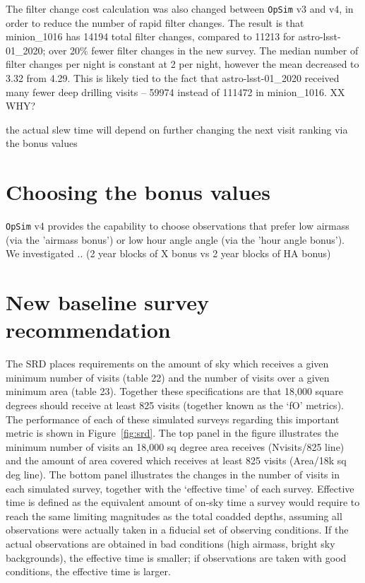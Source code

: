 \documentclass[DM,lsstdraft,authoryear,toc]{lsstdoc}
\newcommand{\opsim}{\texttt{OpSim}\xspace}
\begin{document}
The filter change cost calculation was also changed between \opsim v3 and v4, in order to reduce the number of rapid filter changes. The result is that minion\_1016 has 14194 total filter changes, compared to 11213 for astro-lsst-01\_2020; over 20\% fewer filter changes in the new survey. The median number of filter changes per night is constant at 2 per night, however the mean decreased to 3.32 from 4.29. This is likely tied to the fact that astro-lsst-01\_2020 received many fewer deep drilling visits -- 59974 instead of 111472 in minion\_1016. 
XX WHY? 


the actual slew time will depend on further changing the next visit ranking via the bonus values

\section{Choosing the bonus values} 

\opsim v4 provides the capability to choose observations that prefer low airmass (via the 'airmass bonus') or low hour angle angle (via the 'hour angle bonus'). We investigated ..
(2 year blocks of X bonus vs 2 year blocks of HA bonus)


\section{New baseline survey recommendation}

The SRD places requirements on the amount of sky which receives a given minimum number of visits (table 22) and the number of visits over a given minimum area (table 23). Together these specifications are that 18,000 square degrees should receive at least 825 visits (together known as the `fO' metrics). The performance of each of these simulated surveys regarding this important metric is shown in Figure~\ref{fig:srd}. The top panel in the figure illustrates the minimum number of visits an 18,000 sq degree area receives (Nvisits/825 line) and the amount of area covered which receives at least 825 visits (Area/18k sq deg line).  The bottom panel illustrates the changes in the number of visits in each simulated survey, together with the `effective time' of each survey. Effective time is defined as the equivalent amount of on-sky time a survey would require to reach the same limiting magnitudes as the total coadded depths, assuming all observations were actually taken in a fiducial set of observing conditions. If the actual observations are obtained in bad conditions (high airmass, bright sky backgrounds), the effective time is smaller; if observations are taken with good conditions, the effective time is larger.
\end{document}
